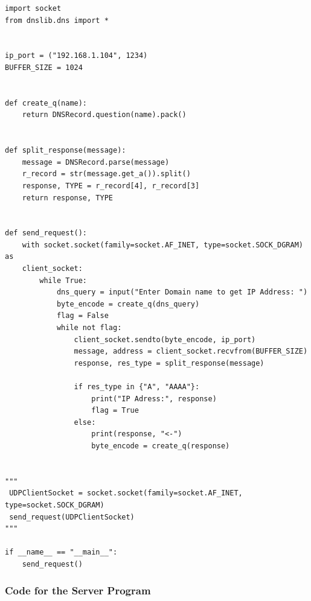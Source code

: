 \documentclass[11pt]{article}
\begin{document}
\begin{verbatim}
import socket
from dnslib.dns import *


ip_port = ("192.168.1.104", 1234)
BUFFER_SIZE = 1024


def create_q(name):
    return DNSRecord.question(name).pack()


def split_response(message):
    message = DNSRecord.parse(message)
    r_record = str(message.get_a()).split()
    response, TYPE = r_record[4], r_record[3]
    return response, TYPE


def send_request():
    with socket.socket(family=socket.AF_INET, type=socket.SOCK_DGRAM) as 
    client_socket:
        while True:
            dns_query = input("Enter Domain name to get IP Address: ")
            byte_encode = create_q(dns_query)
            flag = False
            while not flag:
                client_socket.sendto(byte_encode, ip_port)
                message, address = client_socket.recvfrom(BUFFER_SIZE)
                response, res_type = split_response(message)

                if res_type in {"A", "AAAA"}:
                    print("IP Adress:", response)
                    flag = True
                else:
                    print(response, "<-")
                    byte_encode = create_q(response)


"""
 UDPClientSocket = socket.socket(family=socket.AF_INET, type=socket.SOCK_DGRAM)
 send_request(UDPClientSocket)
"""

if __name__ == "__main__":
    send_request()
\end{verbatim}

\subsubsection{Code for the Server Program}
\end{document}
